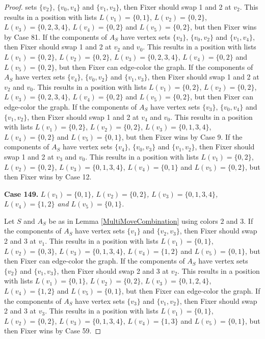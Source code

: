 \documentclass[12pt]{amsart}
\theoremstyle{plain}
\theoremstyle{definition}
\theoremstyle{remark}
\begin{document}
\begin{proof}
sets $\{v_2\}$, $\{v_0, v_4\}$ and $\{v_1, v_3\}$, then Fixer should swap 1 and 2 at $v_2$. This results in a position with lists $L(v_1) = \{0, 1\}$, $L(v_2) = \{0, 2\}$, $L(v_3) = \{0, 2, 3, 4\}$, $L(v_4) = \{0, 2\}$ and $L(v_5) = \{0, 2\}$, but then Fixer wins by Case 81. If the components of $A_S$ have vertex sets $\{v_3\}$, $\{v_0, v_2\}$ and $\{v_1, v_4\}$, then Fixer should swap 1 and 2 at $v_2$ and $v_0$. This results in a position with lists $L(v_1) = \{0, 2\}$, $L(v_2) = \{0, 2\}$, $L(v_3) = \{0, 2, 3, 4\}$, $L(v_4) = \{0, 2\}$ and $L(v_5) = \{0, 2\}$, but then Fixer can edge-color the graph. If the components of $A_S$ have vertex sets $\{v_4\}$, $\{v_0, v_2\}$ and $\{v_1, v_3\}$, then Fixer should swap 1 and 2 at $v_2$ and $v_0$. This results in a position with lists $L(v_1) = \{0, 2\}$, $L(v_2) = \{0, 2\}$, $L(v_3) = \{0, 2, 3, 4\}$, $L(v_4) = \{0, 2\}$ and $L(v_5) = \{0, 2\}$, but then Fixer can edge-color the graph. If the components of $A_S$ have vertex sets $\{v_3\}$, $\{v_0, v_4\}$ and $\{v_1, v_2\}$, then Fixer should swap 1 and 2 at $v_4$ and $v_0$. This results in a position with lists $L(v_1) = \{0, 2\}$, $L(v_2) = \{0, 2\}$, $L(v_3) = \{0, 1, 3, 4\}$, $L(v_4) = \{0, 2\}$ and $L(v_5) = \{0, 1\}$, but then Fixer wins by Case 9. If the components of $A_S$ have vertex sets $\{v_4\}$, $\{v_0, v_3\}$ and $\{v_1, v_2\}$, then Fixer should swap 1 and 2 at $v_3$ and $v_0$. This results in a position with lists $L(v_1) = \{0, 2\}$, $L(v_2) = \{0, 2\}$, $L(v_3) = \{0, 1, 3, 4\}$, $L(v_4) = \{0, 1\}$ and $L(v_5) = \{0, 2\}$, but then Fixer wins by Case 12. 

\noindent\textbf{Case 149.  }\textit{$L(v_1) = \{0, 1\}$, $L(v_2) = \{0, 2\}$, $L(v_3) = \{0, 1, 3, 4\}$, $L(v_4) = \{1, 2\}$ and $L(v_5) = \{0, 1\}$.}

Let $S$ and $A_S$ be as in Lemma \ref{MultiMoveCombination} using colors $2$ and $3$. If the components of $A_S$ have vertex sets $\{v_1\}$ and $\{v_2, v_3\}$, then Fixer should swap 2 and 3 at $v_1$. This results in a position with lists $L(v_1) = \{0, 1\}$, $L(v_2) = \{0, 3\}$, $L(v_3) = \{0, 1, 3, 4\}$, $L(v_4) = \{1, 2\}$ and $L(v_5) = \{0, 1\}$, but then Fixer can edge-color the graph. If the components of $A_S$ have vertex sets $\{v_2\}$ and $\{v_1, v_3\}$, then Fixer should swap 2 and 3 at $v_2$. This results in a position with lists $L(v_1) = \{0, 1\}$, $L(v_2) = \{0, 2\}$, $L(v_3) = \{0, 1, 2, 4\}$, $L(v_4) = \{1, 2\}$ and $L(v_5) = \{0, 1\}$, but then Fixer can edge-color the graph. If the components of $A_S$ have vertex sets $\{v_3\}$ and $\{v_1, v_2\}$, then Fixer should swap 2 and 3 at $v_3$. This results in a position with lists $L(v_1) = \{0, 1\}$, $L(v_2) = \{0, 2\}$, $L(v_3) = \{0, 1, 3, 4\}$, $L(v_4) = \{1, 3\}$ and $L(v_5) = \{0, 1\}$, but then Fixer wins by Case 59. 


\end{proof}
\end{document}
